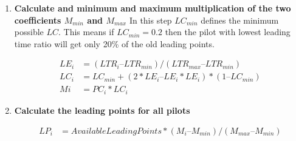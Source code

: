 \documentclass[gap.tex]{subfiles}
\begin{document}
\begin{enumerate}
    \item \textbf{Calculate and minimum and maximum multiplication of the two
        coefficients \(M_{min}\) and \(M_{max}\)} In this step \(LC_{min}\)
        defines the minimum possible \(LC\). This means if \(LC_{min} = 0.2\)
        then the pilot with lowest leading time ratio will get only 20\% of the
        old leading points.
        
        \begin{align*}
            LE_i &= (LTR_i – LTR_{min}) / (LTR_{max} – LTR_{min}) \\
            LC_i &= LC_{min} + (2*LE_i – LE_i * LE_i) * (1 – LC_{min}) \\
            Mi &= PC_i * LC_i
        \end{align*}
            
    \item \textbf{Calculate the leading points for all pilots}
        
        \begin{align*}
            LP_i &= AvailableLeadingPoints * (M_i – M_{min}) / (M_{max} – M_{min} )
        \end{align*}
\end{enumerate}
\end{document}
